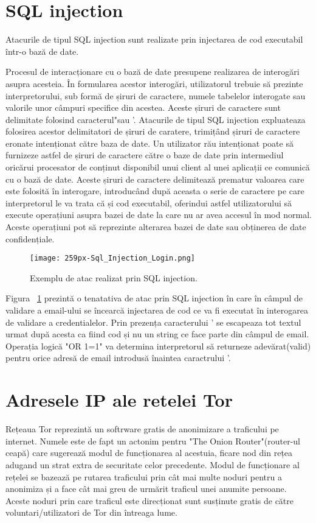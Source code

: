 \section{SQL injection}

Atacurile de tipul SQL injection sunt realizate prin injectarea de cod executabil într-o bază de date. 

Procesul de interacționare cu o bază de date presupene realizarea de interogări asupra acesteia. În formularea acestor interogări, utilizatorul trebuie să prezinte interpretorului, sub formă de șiruri de caractere, numele tabelelor interogate sau valorile unor câmpuri specifice din acestea. Aceste șiruri de caractere sunt delimitate folosind caracterul"sau '. Atacurile de tipul SQL injection expluateaza folosirea acestor delimitatori de șiruri de caratere, trimițând șiruri de caractere eronate intenționat către baza de date. Un utilizator rău intenționat poate să furnizeze astfel de șiruri de caractere către o baze de date prin intermediul oricărui procesator de conținut disponibil unui client al unei aplicații ce comunică cu o bază de date. Aceste șiruri de caractere delimitează prematur valoarea care este folosită în interogare, introducând după aceasta o serie de caractere pe care interpretorul le va trata că și cod executabil, oferindui astfel utilizatorului să execute operațiuni asupra bazei de date la care nu ar avea accesul în mod normal. Aceste operațiuni pot să reprezinte alterarea bazei de date sau obținerea de date confidențiale. \\



\begin{figure}[h]
	\centering
	\texttt{[image: 259px-Sql\_Injection\_Login.png]}
	\caption{Exemplu de atac realizat prin SQL injection.}
	\label{fig:sqli-example}
\end{figure}

Figura ~\ref{fig:sqli-example}  prezintă o tenatativa de atac prin SQL injection în care în câmpul de validare a email-ului se încearcă injectarea de cod ce va fi executat în interogarea de validare a credentialelor. Prin prezența caracterului ' se escapeaza tot textul urmat după acesta ca fiind cod și nu un string ce face parte din câmpul de email. Operația logică "OR 1=1" va determina interpretorul să returneze adevărat(valid) pentru orice adresă de email introdusă înaintea caractrului  '. \\


\section{Adresele IP ale retelei Tor}
Rețeaua Tor reprezintă un softrware gratis de anonimizare a traficului pe internet. Numele este de fapt un actonim pentru "The Onion Router"(router-ul ceapă) care sugerează modul de funcționarea al acestuia, ficare nod din rețea adugand un strat extra de securitate celor precedente. Modul de funcționare al rețelei se bazează pe rutarea traficului prin cât mai multe noduri pentru a anonimiza și a face cât mai greu de urmărit traficul unei anumite persoane. Aceste noduri prin care traficul este direcționat sunt susținute gratis de către voluntari/utilizatori de Tor din întreaga lume. 

